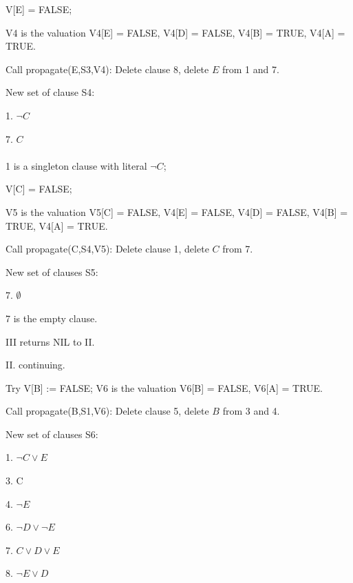 \documentclass[11pt]{article}
\begin{document}
\begin{enumerate}[I.]
		V[E] = FALSE;
		
		V4 is the valuation V4[E] = FALSE, V4[D] = FALSE, V4[B] = TRUE, V4[A] = TRUE.
		
		Call propagate(E,S3,V4): Delete clause 8, delete $ E $ from 1 and 7.
		
		New set of clause S4:
		
		1. $ \neg C $
		
		7. $ C $
		\\
		\\
		1 is a singleton clause with literal $ \neg C $;
		
		V[C] = FALSE;
		
		V5 is the valuation V5[C] = FALSE, V4[E] = FALSE, V4[D] = FALSE, V4[B] = TRUE, V4[A] = TRUE.
		
		Call propagate(C,S4,V5): Delete clause 1, delete $ C $ from 7.
		
		New set of clauses S5:
		
		7. $ \emptyset $

		7 is the empty clause.
		
		III returns NIL to II.
	\end{enumerate}
	
	II. continuing.
	
	Try V[B] := FALSE; V6 is the valuation V6[B] = FALSE, V6[A] = TRUE.
	
	Call propagate(B,S1,V6): Delete clause 5, delete $ B $ from 3 and 4.
	
	New set of clauses S6:
	
	1. $ \neg C\vee E $
	
	3. C
	
	4. $ \neg E $
	
	6. $ \neg D\vee \neg E $
	
	7. $ C\vee D\vee E $
	
	8. $ \neg E\vee D $
	
\end{document}
